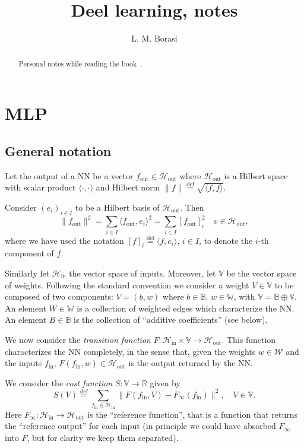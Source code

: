 \documentclass[10pt, a4paper]{article}
\title{Deel learning, notes}
\author{L. M. Borasi}
\theoremstyle{plain}
\theoremstyle{definition}
\theoremstyle{definition}
\theoremstyle{definition}
\theoremstyle{definition}
\theoremstyle{definition}
\theoremstyle{definition}
\theoremstyle{definition}
\theoremstyle{remark}
\theoremstyle{remark}
\theoremstyle{rudin-style-generic}
\theoremstyle{rudin-style-generic*}
\theoremstyle{rudin-style-theorem}
\newcommand{\deq}{\stackrel{\mathrm{def}}{=}}
\newcommand{\RR}{\mathbb R}
\begin{document}
\maketitle
\begin{abstract}
	Personal notes while reading the book~\cite{goodfellowDeepLearning2016}.
\end{abstract}
\tableofcontents


\section{MLP}
\subsection{General notation}\label{sec:general-notation}
Let the output of a NN be a vector $f_{\text{out}}\in \mathcal H_{\text{out}}$ 
where $\mathcal H_{\text{out}}$ is a Hilbert space with scalar product $\langle\cdot,\cdot\rangle$
and Hilbert norm $\|f\|\deq \sqrt{\langle f,f\rangle}$.
 
Consider $(e_i)_{i\in I}$ to be a Hilbert basis of $\mathcal H_{\text{out}}$.
Then
\begin{equation*}
	\| f_{\text{out}} \|^2 = \sum_{i\in I} \langle f_{\text{out}}, e_i \rangle^2 = \sum_{i\in I}  [f_{\text{out}}]_i^2 
	\quad v\in\mathcal H_{\text{out}}
	,
\end{equation*}
where we have used the notation $[f]_i \deq \langle f, e_i\rangle$, $i\in I$, to denote the $i$-th component of $f$.

Similarly let $\mathcal H_{\text{in}}$ the vector space of inputs.
Moreover, let $\mathbb V$ be the vector space of weights.
Following the standard convention we consider a weight $V\in\mathbb V$ to be composed of two components:
$V = (b,w)$ where $b\in \mathbb B$, $w\in\mathbb W$, with $\mathbb V=\mathbb B\oplus\mathbb V$.
An element $W\in\mathbb W$ is a collection of weighted edges which characterize the NN.
An element $B\in\mathbb B$ is the collection of ``additive coefficients'' (see below).

We now consider the \textit{transition function}  $F:\mathcal H_{\text{in}} \times \mathbb V \rightarrow \mathcal H_{\text{out}}$.
This function characterizes the NN completely, in the sense that, given the weights $w\in\mathcal W$ and the inputs $f_{\text{in}}$,
$F(f_{\text{in}}, w)\in\mathcal H_{\text{out}}$ is the output returned by the NN.

We consider the \textit{cost function} $S:\mathbb V\rightarrow \RR$ given by
\begin{equation*}
	S(V) \deq \sum_{f_{\text{in}}\in\mathcal H_{\text{in}}} \| F(f_{\text{in}}, V) - F_\infty(f_{\text{in}}) \|^2,
	\quad V\in\mathbb V
	.
\end{equation*}
Here $F_\infty:\mathcal H_{\text{in}}\rightarrow\mathcal H_{\text{out}}$ is the ``reference function'',
that is a function that returns the ``reference output'' for each input (in principle we could have absorbed $F_\infty$ into $F$,
but for clarity we keep them separated).
\end{document}
